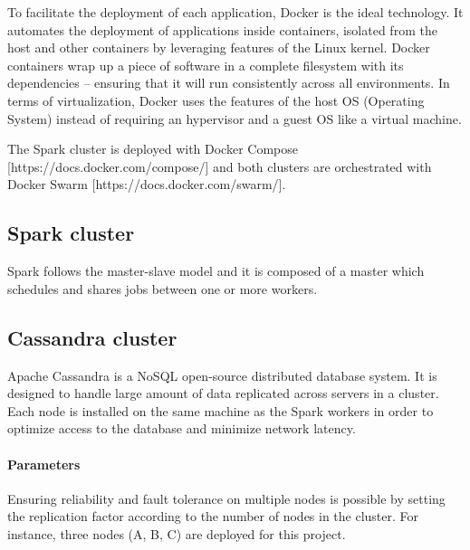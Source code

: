 \documentclass[11pt]{article}
\begin{document}
To facilitate the deployment of each application, \textsf{Docker} is the ideal technology. It automates the deployment of applications inside containers, isolated from the host and other containers by leveraging features of the \textsf{Linux} kernel. \textsf{Docker} containers wrap up a piece of software in a complete filesystem with its dependencies – ensuring that it will run consistently across all environments. In terms of virtualization, \textsf{Docker} uses the features of the host OS (Operating System) instead of requiring an hypervisor and a guest OS like a virtual machine.


The \textsf{Spark} cluster is deployed with \textsf{Docker Compose} [https://docs.docker.com/compose/] and both clusters are orchestrated with \textsf{Docker Swarm} [https://docs.docker.com/swarm/].

\subsection{Spark cluster}

\textsf{Spark} follows the master-slave model and it is composed of a master which schedules and shares jobs between one or more workers.

\subsection{Cassandra cluster}

\textsf{Apache Cassandra} is a \textsf{NoSQL} open-source distributed database system. It is designed to handle large amount of data replicated across servers in a cluster. Each node is installed on the same machine as the \textsf{Spark} workers in order to optimize access to the database and minimize network latency.

\paragraph{Parameters}

Ensuring reliability and fault tolerance on multiple nodes is possible by setting the replication factor according to the number of nodes in the cluster. For instance, three nodes (A, B, C) are deployed for this project. 
\end{document}
